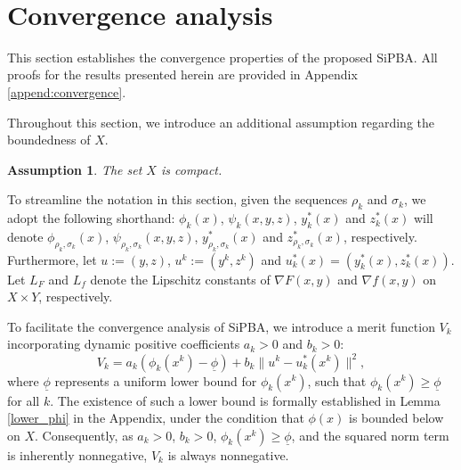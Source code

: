 \documentclass{article}
\newtheorem{assumption}{Assumption}
\begin{document}
\begin{algorithm}[h]%
    \caption{ {\bf Si}ngle-loop {\bf P}essimistic {\bf B}ilevel {\bf A}lgorithm ({\bf SiPBA})}\label{algorithm}
    \\
\end{algorithm}
\vspace{-10pt}


\section{Convergence analysis}\label{section theoretical investigations}

This section establishes the convergence properties of the proposed SiPBA. All proofs for the results presented herein are provided in Appendix \ref{append:convergence}.

Throughout this section, we introduce an additional assumption regarding the boundedness of $X$.

\begin{assumption}\label{assum4}
    The set $X$ is compact.
\end{assumption}

To streamline the notation in this section, given the sequences $\rho_k$ and $\sigma_k$, we adopt the following shorthand: $\phi_k(x)$, $\psi_k(x,y,z)$, $y^*_k(x)$ and $z^*_k(x)$ will denote $\phi_{\rho_k,\sigma_k}(x)$, $\psi_{\rho_k,\sigma_k}(x,y,z)$, $y^*_{\rho_k,\sigma_k}(x)$ and $z^*_{\rho_k,\sigma_k}(x)$, respectively. Furthermore, let $u:=(y,z)$, $u^k:=(y^k,z^k)$ and $u^*_k(x) = (y^*_k(x), z^*_k(x))$.
Let $L_F$ and $L_f$ denote the Lipschitz constants of $\nabla F(x,y)$ and $\nabla f(x,y)$ on $X \times Y$, respectively.

To facilitate the convergence analysis of SiPBA, we introduce a merit function $V_k$ incorporating dynamic positive coefficients $a_k > 0$ and $b_k >0$:
\begin{equation}\label{V_def}
      V_k = a_k(\phi_k(x^k) - \underline{\phi}) + b_k\| u^{k}- u_{k}^*(x^k)\|^2, 
\end{equation}
where $\underline{\phi}$ represents a uniform lower bound for $\phi_k(x^k)$, such that $\phi_k(x^k) \ge \underline{\phi}$ for all $k$. The existence of such a lower bound is formally established in Lemma \ref{lower_phi} in the Appendix, under the condition that $\phi(x)$ is bounded below on $X$. Consequently, as $a_k > 0$, $b_k >0$, $\phi_k(x^k) \ge \underline{\phi}$, and the squared norm term is inherently nonnegative, $V_k$ is always nonnegative.
\end{document}
